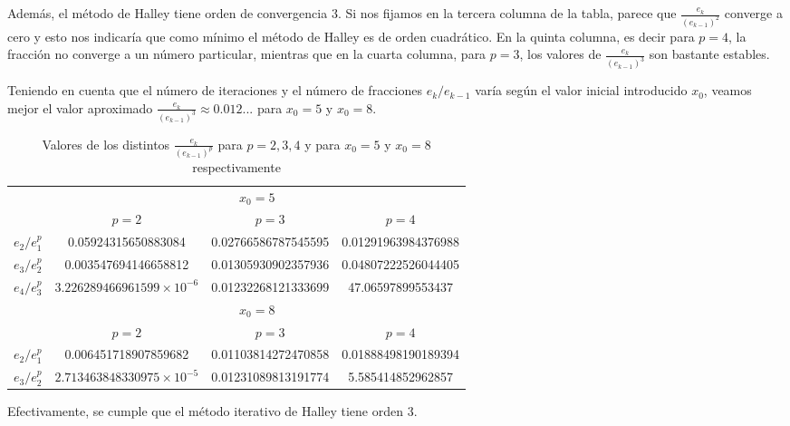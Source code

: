 \documentclass[a4paper]{article}
\begin{document}
Además, el método de Halley tiene orden de convergencia 3. Si nos fijamos en la tercera columna de la tabla, parece que $\frac{e_k}{(e_{k-1})^2}$ converge a cero y esto nos indicaría que como mínimo el método de Halley es de orden cuadrático. En la quinta columna, es decir para $p=4$, la fracción no converge a un número particular, mientras que en la cuarta columna, para $p=3$, los valores de $\frac{e_k}{(e_{k-1})^3}$ son bastante estables.\par
Teniendo en cuenta que el número de iteraciones y el número de fracciones $e_k/e_{k-1}$ varía según el valor inicial introducido $x_0$, veamos mejor el valor aproximado $\frac{e_k}{(e_{k-1})^3}\approx0.012...$ para $x_0=5$ y $x_0=8$.\par
\begin{table}[ht]
    \centering
    \begin{tabular}{|c|c|c|c|}
        \hline
        & \multicolumn{3}{c|}{$x_0=5$} \\
        \cline{2-4}
        & $p=2$ & $p=3$& $p=4$  \\
        \hline
        $e_2/e_1^p$ & 0.05924315650883084 & 0.02766586787545595 & 0.01291963984376988 \\	
        \hline
        $e_3/e_2^p$ & 0.003547694146658812 & 0.01305930902357936 & 0.04807222526044405 \\	
        \hline
        $e_4/e_3^p$ & $3.226289466961599\times10^{-6}$ & 0.01232268121333699 & 47.06597899553437 \\
        \hline
        \hline
        & \multicolumn{3}{c|}{$x_0=8$} \\
        \cline{2-4}
        & $p=2$ & $p=3$ & $p=4$ \\
        \hline
        $e_2/e_1^p$ & 0.006451718907859682 & 0.01103814272470858 & 0.01888498190189394 \\	
        \hline
        $e_3/e_2^p$ & $2.713463848330975\times10^{-5}$ & 0.01231089813191774 & 5.585414852962857 \\	
        \hline
    \end{tabular}
    \caption{Valores de los distintos $\frac{e_k}{(e_{k-1})^p}$ para $p=2,3,4$ y para $x_0=5$ y $x_0=8$ respectivamente}
    \label{tab:my_label5}
\end{table}
Efectivamente, se cumple que el método iterativo de Halley tiene orden 3.
\newpage
\end{document}
